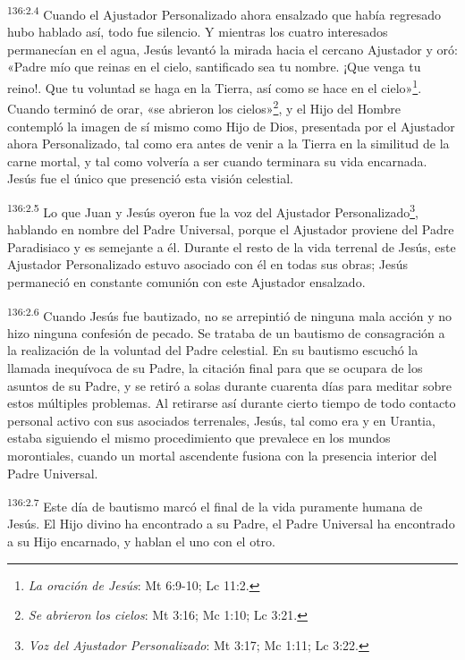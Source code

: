 \par
\textsuperscript{136:2.4} Cuando el Ajustador Personalizado ahora ensalzado que había regresado hubo hablado así, todo fue silencio. Y mientras los cuatro interesados permanecían en el agua, Jesús levantó la mirada hacia el cercano Ajustador y oró: «Padre mío que reinas en el cielo, santificado sea tu nombre. ¡Que venga tu reino!. Que tu voluntad se haga en la Tierra, así como se hace en el cielo»\footnote{\textit{La oración de Jesús}: Mt 6:9-10; Lc 11:2.}. Cuando terminó de orar, «se abrieron los cielos»\footnote{\textit{Se abrieron los cielos}: Mt 3:16; Mc 1:10; Lc 3:21.}, y el Hijo del Hombre contempló la imagen de sí mismo como Hijo de Dios, presentada por el Ajustador ahora Personalizado, tal como era antes de venir a la Tierra en la similitud de la carne mortal, y tal como volvería a ser cuando terminara su vida encarnada. Jesús fue el único que presenció esta visión celestial.

\par
\textsuperscript{136:2.5} Lo que Juan y Jesús oyeron fue la voz del Ajustador Personalizado\footnote{\textit{Voz del Ajustador Personalizado}: Mt 3:17; Mc 1:11; Lc 3:22.}, hablando en nombre del Padre Universal, porque el Ajustador proviene del Padre Paradisiaco y es semejante a él. Durante el resto de la vida terrenal de Jesús, este Ajustador Personalizado estuvo asociado con él en todas sus obras; Jesús permaneció en constante comunión con este Ajustador ensalzado.

\par
\textsuperscript{136:2.6} Cuando Jesús fue bautizado, no se arrepintió de ninguna mala acción y no hizo ninguna confesión de pecado. Se trataba de un bautismo de consagración a la realización de la voluntad del Padre celestial. En su bautismo escuchó la llamada inequívoca de su Padre, la citación final para que se ocupara de los asuntos de su Padre, y se retiró a solas durante cuarenta días para meditar sobre estos múltiples problemas. Al retirarse así durante cierto tiempo de todo contacto personal activo con sus asociados terrenales, Jesús, tal como era y en Urantia, estaba siguiendo el mismo procedimiento que prevalece en los mundos morontiales, cuando un mortal ascendente fusiona con la presencia interior del Padre Universal.

\par
\textsuperscript{136:2.7} Este día de bautismo marcó el final de la vida puramente humana de Jesús. El Hijo divino ha encontrado a su Padre, el Padre Universal ha encontrado a su Hijo encarnado, y hablan el uno con el otro.

